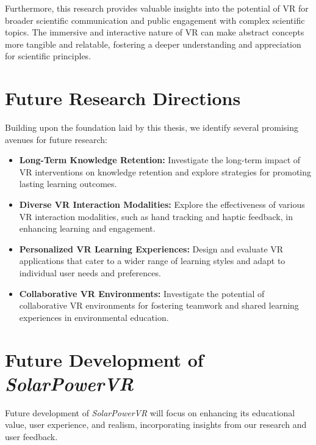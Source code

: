 \documentclass[draft, final]{vutinfth} %
\begin{document}
Furthermore, this research provides valuable insights into the potential of VR for broader scientific communication and public engagement with complex scientific topics. The immersive and interactive nature of VR can make abstract concepts more tangible and relatable, fostering a deeper understanding and appreciation for scientific principles.

\section{Future Research Directions}

Building upon the foundation laid by this thesis, we identify several promising avenues for future research:

\begin{itemize}
    \item \textbf{Long-Term Knowledge Retention:} Investigate the long-term impact of VR interventions on knowledge retention and explore strategies for promoting lasting learning outcomes.
    \item \textbf{Diverse VR Interaction Modalities:} Explore the effectiveness of various VR interaction modalities, such as hand tracking and haptic feedback, in enhancing learning and engagement.
    \item \textbf{Personalized VR Learning Experiences:} Design and evaluate VR applications that cater to a wider range of learning styles and adapt to individual user needs and preferences.
    \item \textbf{Collaborative VR Environments:} Investigate the potential of collaborative VR environments for fostering teamwork and shared learning experiences in environmental education.
\end{itemize}

\section{Future Development of \textit{SolarPowerVR}}

Future development of \textit{SolarPowerVR} will focus on enhancing its educational value, user experience, and realism, incorporating insights from our research and user feedback. 
\end{document}
